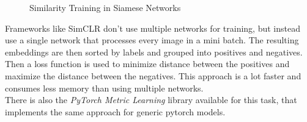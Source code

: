 \documentclass[12pt,a4paper]{report}
\begin{document}
\begin{figure}[h]
    \centering
    \qquad
    \caption{Similarity Training in Siamese Networks \cite{simclrartikle}}
\end{figure}

Frameworks like SimCLR\cite{simclr} don't use multiple networks for training, but instead use a single network that processes every image in a mini batch.
The resulting embeddings are then sorted by labels and grouped into positives and negatives.
Then a loss function is used to minimize distance between the positives and maximize the distance between the negatives.
This approach is a lot faster and consumes less memory than using multiple networks.
\\
There is also the \textit{PyTorch Metric Learning}\cite{musgrave2020pytorch} library available for this task, that implements the same approach for generic pytorch models.

\newpage
\end{document}
